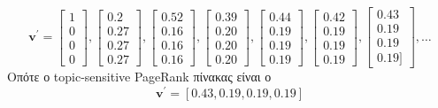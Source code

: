 \documentclass[a4paper,11pt]{article}
\begin{document}
\[
	\textbf{v}^\prime=
	\begin{bmatrix}1 \\ 0 \\ 0 \\ 0\end{bmatrix},
	\begin{bmatrix}0.2 \\ 0.27 \\ 0.27 \\ 0.27\end{bmatrix},
	\begin{bmatrix}0.52 \\ 0.16 \\ 0.16 \\ 0.16\end{bmatrix},
	\begin{bmatrix}0.39 \\ 0.20 \\ 0.20 \\ 0.20\end{bmatrix},
	\begin{bmatrix}0.44 \\ 0.19 \\ 0.19 \\ 0.19\end{bmatrix},
	\begin{bmatrix}0.42 \\ 0.19 \\ 0.19 \\ 0.19\end{bmatrix},
	\begin{bmatrix}0.43 \\ 0.19 \\ 0.19 \\ 0.19]\end{bmatrix},
	\dots
\]
Οπότε ο topic-sensitive PageRank πίνακας είναι ο
\[ \textbf{v}^\prime = [0.43,0.19,0.19,0.19] \]
\end{document}
